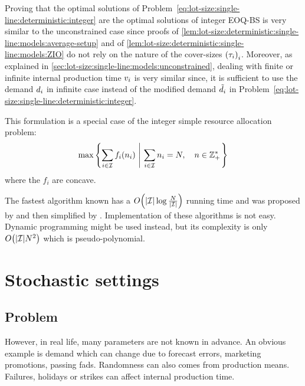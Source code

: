 Proving that the optimal solutions of Problem~\eqref{eq:lot-size:single-line:deterministic:integer} are the optimal solutions of integer EOQ-BS is very similar to the unconstrained case since proofs of \cref{lem:lot-size:deterministic:single-line:models:average-setup} and of \cref{lem:lot-size:deterministic:single-line:models:ZIO} do not rely on the nature of the cover-sizes $\bracket{\cover_i}_i$.
Moreover, as explained in \cref{sec:lot-size:single-line:models:unconstrained}, dealing with finite or infinite internal production time $v_i$ is very similar since, it is sufficient to use the demand $d_i$ in infinite case instead of the modified demand $\tilde{d}_i$ in Problem~\eqref{eq:lot-size:single-line:deterministic:integer}.


\medskip


This formulation is a special case of the integer simple resource allocation problem:
\begin{equation}
  \max\crbracket{\sum_{i\in\REF} f_i\bracket{\freq_i}\ \left|\ \sum_{i\in\REF}\freq_i=\nbsetups,\quad\freq\in \ZZ_+^*\right.}
\end{equation}
where the $f_i$ are concave.


The fastest algorithm known has a $O\bracket{\card{\REF}\log{\frac{\nbsetups}{\card{\REF}}}}$ running time and was proposed by \citet{Frederickson1982} and then simplified by \citet{Hochbaum1994}.
Implementation of these algorithms is not easy.
Dynamic programming might be used instead, but its complexity is only $O\bracket{\card{\REF}\nbsetups^2}$ which is pseudo-polynomial.



\section{Stochastic settings}


\subsection{Problem}
\label{sec:lot-size:single-line:stochastic:problem}


However, in real life, many parameters are not known in advance.
An obvious example is demand which can change due to forecast errors, marketing promotions, passing fads.
Randomness can also comes from production means.
Failures, holidays or strikes can affect internal production time.


